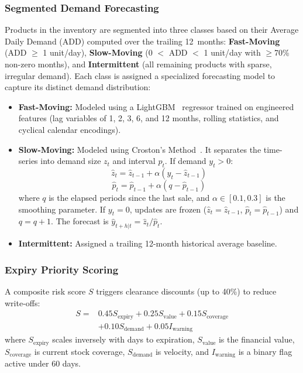 \documentclass[conference]{IEEEtran}
\begin{document}
\subsubsection{Segmented Demand Forecasting}
Products in the inventory are segmented into three classes based on their Average Daily Demand (ADD) computed over the trailing 12~months: \textbf{Fast-Moving} (ADD $\geq$ 1 unit/day), \textbf{Slow-Moving} (0 $<$ ADD $<$ 1 unit/day with $\geq$70\% non-zero months), and \textbf{Intermittent} (all remaining products with sparse, irregular demand). Each class is assigned a specialized forecasting model to capture its distinct demand distribution:
\begin{itemize}
\item \textbf{Fast-Moving:} Modeled using a LightGBM~\cite{lightgbm} regressor trained on engineered features (lag variables of 1, 2, 3, 6, and 12 months, rolling statistics, and cyclical calendar encodings).
\item \textbf{Slow-Moving:} Modeled using Croston's Method~\cite{croston}. It separates the time-series into demand size $z_t$ and interval $p_t$. If demand $y_t > 0$:
\begin{equation}
\hat{z}_t = \hat{z}_{t-1} + \alpha(y_t - \hat{z}_{t-1})
\end{equation}
\begin{equation}
\hat{p}_t = \hat{p}_{t-1} + \alpha(q - \hat{p}_{t-1})
\end{equation}
where $q$ is the elapsed periods since the last sale, and $\alpha \in [0.1, 0.3]$ is the smoothing parameter. If $y_t = 0$, updates are frozen ($\hat{z}_t = \hat{z}_{t-1}$, $\hat{p}_t = \hat{p}_{t-1}$) and $q = q + 1$. The forecast is $\hat{y}_{t+h|t} = \hat{z}_t / \hat{p}_t$.
\item \textbf{Intermittent:} Assigned a trailing 12-month historical average baseline.
\end{itemize}

\subsubsection{Expiry Priority Scoring}
A composite risk score $S$ triggers clearance discounts (up to 40\%) to reduce write-offs:
\begin{equation}
\begin{split}
S = {} & 0.45 S_{\text{expiry}} + 0.25 S_{\text{value}} + 0.15 S_{\text{coverage}} \\
       & + 0.10 S_{\text{demand}} + 0.05 I_{\text{warning}}
\end{split}
\end{equation}
where $S_{\text{expiry}}$ scales inversely with days to expiration, $S_{\text{value}}$ is the financial value, $S_{\text{coverage}}$ is current stock coverage, $S_{\text{demand}}$ is velocity, and $I_{\text{warning}}$ is a binary flag active under 60 days.
\end{document}
